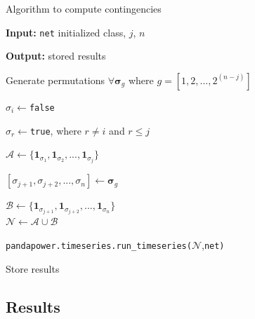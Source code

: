 \begin{frame}{Algorithm to compute contingencies}

\begin{algorithm}[H]
\DontPrintSemicolon
  

  \textbf{Input:} \texttt{net} initialized class, $j$, $n$

  \textbf{Output:} stored results

  Generate permutations $\forall \bm{\sigma}_{g}$ where $g=[1,2,...,2^{(n-j)}]$

  {
    $\sigma_i\gets$\texttt{false}

    $\sigma_r\gets$\texttt{true}, where $r\neq i$ and $r\leq j$

    $\mathcal{A}\gets \{\mathbf{1}_{\sigma_{1}}, \mathbf{1}_{\sigma_{2}},..., \mathbf{1}_{\sigma_{j}}\}$\\

    {
      $[\sigma_{j+1}, \sigma_{j+2},..., \sigma_n] \gets \bm{\sigma}_g$

    $\mathcal{B} \gets \{\mathbf{1}_{\sigma_{j+1}}, \mathbf{1}_{\sigma_{j+2}},..., \mathbf{1}_{\sigma_{n}}\}$\\

    $\mathcal{N} \gets \mathcal{A} \cup \mathcal{B}$

    \texttt{pandapower.timeseries.run\_timeseries(}$\mathcal{N}$,\texttt{net)}

    Store results
    }
  }
\caption{Pseudocode to solve the contingencies}
\label{alg:1}
\end{algorithm}

\end{frame}


\subsection{Results}

